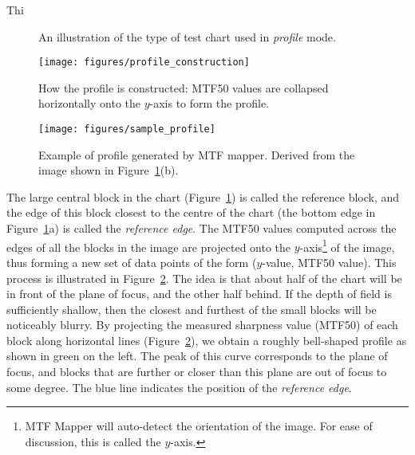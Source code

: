 \documentclass[a4paper]{article}
\begin{document}
Thi

\begin{figure}
\centering
{}
\caption{An illustration of the type of test chart used in \emph{profile}
mode.}
\label{fig:profile_test_chart}
\end{figure}

\begin{figure}
\centering
\texttt{[image: figures/profile\_construction]}
\caption{How the profile is constructed: MTF50 values are collapsed
horizontally onto the $y$-axis to form the profile.}
\label{fig:profile_construction}
\end{figure}

\begin{figure}
\centering
\texttt{[image: figures/sample\_profile]}
\caption{Example of profile generated by MTF mapper. Derived from the image
shown in Figure~\ref{fig:profile_test_chart}(b).}
\label{fig:sample_profile}
\end{figure}

The large central block in the chart (Figure~\ref{fig:profile_test_chart}) 
is called the reference block, and the edge of this block closest to the
centre of the chart (the bottom edge in Figure~\ref{fig:profile_test_chart}a)
is called the \emph{reference edge}.
The MTF50 values computed across the edges of all the blocks in the image
are projected onto the $y$-axis\footnote{MTF Mapper will auto-detect the
orientation of the image. For ease of discussion, this is called the
$y$-axis.} of the image, thus forming a new set of data
points of the form ($y$-value, MTF50 value). This process is illustrated in
Figure~\ref{fig:profile_construction}. The idea is that about half of the
chart will be in front of the plane of focus, and the other half behind. If
the depth of field is sufficiently shallow, then the closest and furthest of
the small blocks will be noticeably blurry. By projecting the measured
sharpness value (MTF50) of each block along horizontal lines
(Figure~\ref{fig:profile_construction}), we obtain a roughly bell-shaped
profile as shown in green on the left. The peak of this curve corresponds to the plane
of focus, and blocks that are further or closer than this plane are out of
focus to some degree. The blue line indicates the position of the
\emph{reference edge}.
\end{document}

